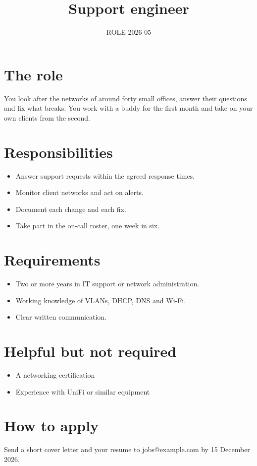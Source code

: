 \documentclass{jupiter-form}
\title{Support engineer}
\subtitle{ROLE-2026-05}
\begin{document}
\maketitle
{}
\jprowend

\section{The role}
You look after the networks of around forty small offices, answer their questions and fix what breaks. You work with a buddy for the first month and take on your own clients from the second.

\section{Responsibilities}
\begin{itemize}
  \item Answer support requests within the agreed response times.
  \item Monitor client networks and act on alerts.
  \item Document each change and each fix.
  \item Take part in the on-call roster, one week in six.
\end{itemize}

\section{Requirements}
\begin{itemize}
  \item Two or more years in IT support or network administration.
  \item Working knowledge of VLANs, DHCP, DNS and Wi-Fi.
  \item Clear written communication.
\end{itemize}

\section{Helpful but not required}
\begin{itemize}
  \item A networking certification
  \item Experience with UniFi or similar equipment
\end{itemize}

\section{How to apply}
Send a short cover letter and your resume to jobs@example.com by 15 December 2026.
\end{document}
